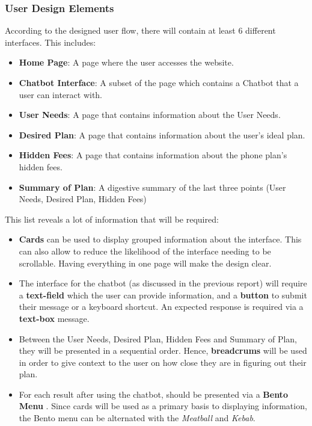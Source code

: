 \documentclass[conference]{IEEEtran}
\begin{document}
\subsubsection{User Design Elements}
According to the designed user flow, there will contain at least 6 different interfaces. This includes:
\begin{itemize}
  \item \textbf{Home Page}: A page where the user accesses the website.
  \item \textbf{Chatbot Interface}: A subset of the page which contains a Chatbot that a user can interact with.
  \item \textbf{User Needs}: A page that contains information about the User Needs.
  \item \textbf{Desired Plan}: A page that contains information about the user's ideal plan.
  \item \textbf{Hidden Fees}: A page that contains information about the phone plan's hidden fees.
  \item \textbf{Summary of Plan}: A digestive summary of the last three points (User Needs, Desired Plan, Hidden Fees)
\end{itemize}
This list reveals a lot of information that will be required:
\begin{itemize}
    \item \textbf{Cards} can be used to display grouped information about the interface. This can also allow to reduce the likelihood of the interface needing to be scrollable. Having everything in one page will make the design clear. 
    \item The interface for the chatbot (as discussed in the previous report) will require a \textbf{text-field} which the user can provide information, and a \textbf{button} to submit their message or a keyboard shortcut. An expected response is required via a \textbf{text-box} message.
    \item Between the User Needs, Desired Plan, Hidden Fees and Summary of Plan, they will be presented in a sequential order. Hence, \textbf{breadcrums} will be used in order to give context to the user on how close they are in figuring out their plan. 
    \item For each result after using the chatbot, should be presented via a \textbf{Bento Menu} \cite{CareerFoundryUI}. Since cards will be used as a primary basis to displaying information, the Bento menu can be alternated with the \textit{Meatball} and \textit{Kebab}. 
\end{itemize}
\end{document}
